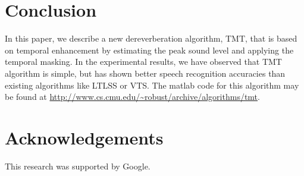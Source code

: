 \documentclass[a4paper]{article}
\begin{document}
\section{Conclusion}
In this paper, we describe a new dereverberation algorithm,
TMT, that is based on temporal enhancement by estimating the
peak sound level and applying the temporal masking. In the
experimental results, we have observed that TMT algorithm
is simple, but has shown better speech recognition accuracies
than existing algorithms like LTLSS or VTS. The matlab code
for this algorithm may be found at 
\url{http://www.cs.cmu.edu/~robust/archive/algorithms/tmt}.

\section{Acknowledgements}
This research was supported by Google.
\end{document}
